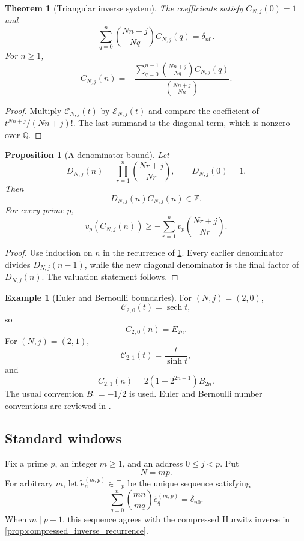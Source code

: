 \documentclass{aomart}
\newtheorem{theorem}{Theorem}[section]
\newtheorem{proposition}[proposition]{Proposition}
\theoremstyle{definition}
\newtheorem{example}[example]{Example}
\theoremstyle{remark}
\newcommand{\ZZ}{\mathbb Z}
\newcommand{\QQ}{\mathbb Q}
\newcommand{\FF}{\mathbb F}
\newcommand{\Ecal}{\mathcal E}
\newcommand{\Ccal}{\mathcal C}
\newcommand{\vp}{v_p}
\begin{document}
\begin{theorem}[Triangular inverse system]\label{thm:triangular_inverse}
The coefficients satisfy \(C_{N,j}(0)=1\) and
\[
\boxed{
\sum_{q=0}^{n}
\binom{Nn+j}{Nq}
C_{N,j}(q)
=
\delta_{n0}.
}
\]
For \(n\geq1\),
\[
\boxed{
C_{N,j}(n)
=
-
\frac{
\sum_{q=0}^{n-1}
\binom{Nn+j}{Nq}C_{N,j}(q)
}{
\binom{Nn+j}{Nn}
}.
}
\]
\end{theorem}

\begin{proof}
Multiply \(\Ccal_{N,j}(t)\) by \(\Ecal_{N,j}(t)\) and compare the coefficient of \(t^{Nn+j}/(Nn+j)!\). The last summand is the diagonal term, which is nonzero over \(\QQ\).
\end{proof}

\begin{proposition}[A denominator bound]\label{prop:denominator_bound}
Let
\[
D_{N,j}(n)
=
\prod_{r=1}^{n}
\binom{Nr+j}{Nr},
\qquad
D_{N,j}(0)=1.
\]
Then
\[
\boxed{
D_{N,j}(n)C_{N,j}(n)
\in
\ZZ.
}
\]
For every prime \(p\),
\[
\vp(C_{N,j}(n))
\geq
-
\sum_{r=1}^{n}
\vp\binom{Nr+j}{Nr}.
\]
\end{proposition}

\begin{proof}
Use induction on \(n\) in the recurrence of \cref{thm:triangular_inverse}. Every earlier denominator divides \(D_{N,j}(n-1)\), while the new diagonal denominator is the final factor of \(D_{N,j}(n)\). The valuation statement follows.
\end{proof}

\begin{example}[Euler and Bernoulli boundaries]\label{ex:euler_bernoulli_boundaries}
For \((N,j)=(2,0)\),
\[
\Ccal_{2,0}(t)=\operatorname{sech}t,
\]
so
\[
C_{2,0}(n)=E_{2n}.
\]
For \((N,j)=(2,1)\),
\[
\Ccal_{2,1}(t)=\frac{t}{\sinh t},
\]
and
\[
C_{2,1}(n)
=
2\left(1-2^{2n-1}\right)B_{2n}.
\]
The usual convention \(B_1=-1/2\) is used. Euler and Bernoulli number conventions are reviewed in \cite{Comtet1974,Stanley2012}.
\end{example}

\subsection{Standard windows}

Fix a prime \(p\), an integer \(m\geq1\), and an address \(0\leq j<p\). Put
\[
N=mp.
\]
For arbitrary \(m\), let \(\widetilde e_n^{(m,p)}\in\FF_p\) be the unique sequence satisfying
\[
\boxed{
\sum_{q=0}^{n}
\binom{mn}{mq}
\widetilde e_q^{(m,p)}
=
\delta_{n0}.
}
\]
When \(m\mid p-1\), this sequence agrees with the compressed Hurwitz inverse in \cref{prop:compressed_inverse_recurrence}.
\end{document}
